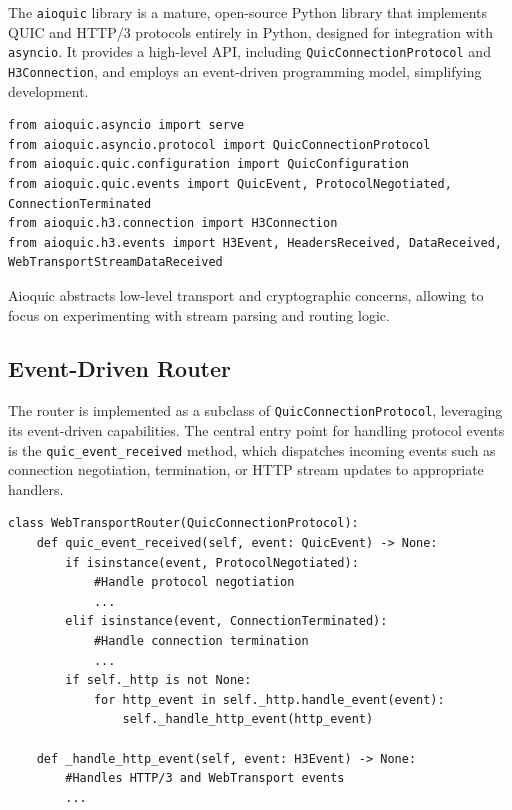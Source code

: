 The \texttt{aioquic} library \cite{aioquic-repo} is a mature, open-source Python \cite{python-docs} library that implements QUIC and HTTP/3 protocols entirely in Python, designed for integration with \texttt{asyncio}. It provides a high-level API, including \texttt{QuicConnectionProtocol} and \texttt{H3Connection}, and employs an event-driven programming model, simplifying development.

\begin{lstlisting}[breaklines=true,basicstyle=\small\ttfamily,frame=single]
from aioquic.asyncio import serve
from aioquic.asyncio.protocol import QuicConnectionProtocol
from aioquic.quic.configuration import QuicConfiguration
from aioquic.quic.events import QuicEvent, ProtocolNegotiated, ConnectionTerminated
from aioquic.h3.connection import H3Connection
from aioquic.h3.events import H3Event, HeadersReceived, DataReceived, WebTransportStreamDataReceived
\end{lstlisting}

Aioquic abstracts low-level transport and cryptographic concerns, allowing to focus on experimenting with stream parsing and routing logic.

\subsection{Event-Driven Router}
The router is implemented as a subclass of \texttt{QuicConnectionProtocol}, leveraging its event-driven capabilities. The central entry point for handling protocol events is the \texttt{quic\_event\_received} method, which dispatches incoming events such as connection negotiation, termination, or HTTP stream updates to appropriate handlers.

\begin{lstlisting}[breaklines=true,basicstyle=\small\ttfamily,frame=single]
class WebTransportRouter(QuicConnectionProtocol):
    def quic_event_received(self, event: QuicEvent) -> None:
        if isinstance(event, ProtocolNegotiated):
            #Handle protocol negotiation
            ...
        elif isinstance(event, ConnectionTerminated):
            #Handle connection termination
            ...
        if self._http is not None:
            for http_event in self._http.handle_event(event):
                self._handle_http_event(http_event)

    def _handle_http_event(self, event: H3Event) -> None:
        #Handles HTTP/3 and WebTransport events
        ...
\end{lstlisting}

